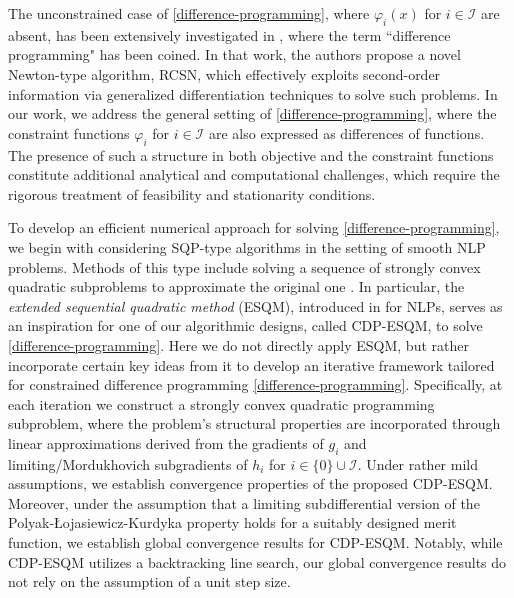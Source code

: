 \documentclass[11pt,a4paper]{article}
\theoremstyle{plain}
\begin{document}
The unconstrained case of \eqref{difference-programming}, where $\varphi_i(x)$ for $i \in \mathcal{I}$ are absent, has been extensively investigated in \cite{aragon2023coderivative}, where the term ``difference programming" has been coined. In that work, the authors propose a novel Newton-type algorithm, RCSN, which effectively exploits second-order information via generalized differentiation techniques to solve such problems. In our work, we address the general setting of \eqref{difference-programming}, where the constraint functions $\varphi_i$ for $i\in\mathcal{I}$ are also expressed as differences of functions. The presence of such a structure in both objective and the constraint functions constitute additional analytical and computational challenges, which require the rigorous treatment of feasibility and stationarity conditions.

To develop an efficient numerical approach for solving \eqref{difference-programming}, we begin with considering SQP-type algorithms in the setting of smooth NLP problems. Methods of this type include solving a sequence of strongly convex quadratic subproblems to approximate the original one \cite{boggs1995sequential,lawrence2001}.
In particular, the {\em extended sequential quadratic method} (ESQM), introduced in \cite{auslender2013extended} for NLPs, serves as an inspiration for one of our algorithmic designs,  called CDP-ESQM, to solve \eqref{difference-programming}. Here we do not directly apply ESQM, but rather incorporate certain key ideas  from it to develop an iterative framework tailored for constrained difference programming \eqref{difference-programming}. Specifically, at each iteration we construct a strongly convex quadratic programming subproblem, where the problem's structural properties are incorporated through linear approximations derived from the gradients of \( g_i \) and limiting/Mordukhovich subgradients of \( h_i \) for \( i \in \{0\} \cup \mathcal{I} \). Under rather mild assumptions, we establish convergence properties of the proposed CDP-ESQM. {Moreover, under the assumption that a limiting subdifferential version of the Polyak-\L ojasiewicz-Kurdyka property holds for a suitably designed merit function, we establish global convergence results for CDP-ESQM. Notably, while CDP-ESQM utilizes a backtracking line search, our global convergence results do not rely on the assumption of a unit step size.} 
\end{document}
